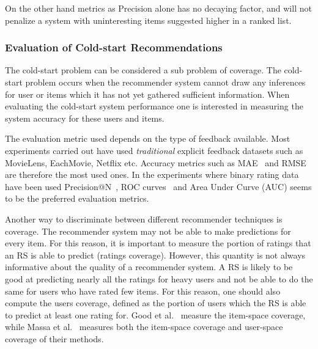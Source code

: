 On the other hand metrics as Precision alone has no decaying factor, and will
not penalize a system with uninteresting items suggested higher in a ranked
list.



\subsubsection{Evaluation of Cold-start Recommendations}
\label{sec:cold-start-eval}

The cold-start problem can be considered a sub problem of coverage. The
cold-start problem occurs when the recommender system cannot draw any
inferences for user or items which it has not yet gathered sufficient
information. When evaluating the cold-start system performance one is
interested in measuring the system accuracy for these users and items.

The evaluation metric used depends on the type of feedback available.  Most
experiments carried out have used \emph{traditional} explicit feedback datasets
such as MovieLens, EachMovie, Netflix etc. Accuracy metrics such as
MAE~\cite{Rashid2002, Rashid2008, Massa2004, Massa2007, Stern2009} and
RMSE~\cite{Agarwal2009, Agarwal2010} are therefore the most used ones. In the
experiments where binary rating data have been used Precision@N~\cite{Liu2011,
Gantner2010}, ROC curves~\cite{Agarwal2009, Gantner2010, Schein2002} and Area
Under Curve (AUC) \cite{Liu2011, Gantner2010} seems to be the preferred
evaluation metrics.

Another way to discriminate between different recommender techniques is
coverage. The recommender system may not be able to make predictions for every
item. For this reason, it is important to measure the portion of ratings that
an RS is able to predict (ratings coverage). However, this quantity is not
always informative about the quality of a recommender system. A RS is likely to
be good at predicting nearly all the ratings for heavy users and not be able to
do the same for users who have rated few items. For this reason, one should
also compute the users coverage, defined as the portion of users which the RS
is able to predict at least one rating for. Good et al.~\cite{Good1999}
measure the item-space coverage, while Massa et al.~\cite{Massa2004,
Massa2007} measures both the item-space coverage and user-space coverage of
their methods.

